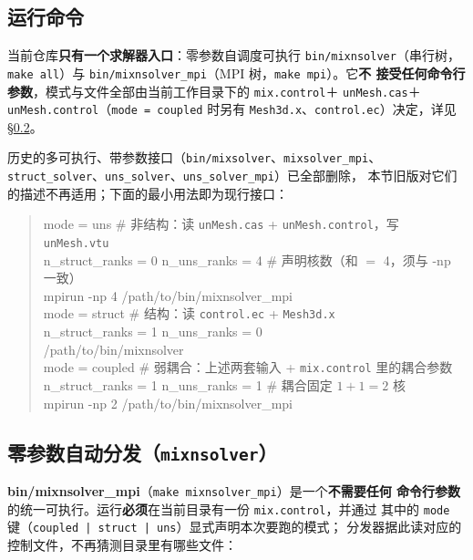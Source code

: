 \documentclass[11pt,a4paper]{ctexart}
\begin{document}
\subsection{运行命令}

当前仓库\textbf{只有一个求解器入口}：零参数自调度可执行 \texttt{bin/mixnsolver}（串行树，
\texttt{make all}）与 \texttt{bin/mixnsolver\_mpi}（MPI 树，\texttt{make mpi}）。它\textbf{不
接受任何命令行参数}，模式与文件全部由当前工作目录下的 \texttt{mix.control}＋
\texttt{unMesh.cas}＋\texttt{unMesh.control}（\texttt{mode = coupled} 时另有
\texttt{Mesh3d.x}、\texttt{control.ec}）决定，详见 \S\ref{sec:autodispatch}。

历史的多可执行、带参数接口（\texttt{bin/mixsolver}、\texttt{mixsolver\_mpi}、
\texttt{struct\_solver}、\texttt{uns\_solver}、\texttt{uns\_solver\_mpi}）已全部删除，
本节旧版对它们的描述不再适用；下面的最小用法即为现行接口：

\begin{quote}\ttfamily\small
mode = uns \qquad \# 非结构：读 \texttt{unMesh.cas} + \texttt{unMesh.control}，写 \texttt{unMesh.vtu}\\
n\_struct\_ranks = 0 \quad n\_uns\_ranks = 4 \qquad \# 声明核数（和 $=$ 4，须与 -np 一致）\\
mpirun -np 4 /path/to/bin/mixnsolver\_mpi\\
\medskip
mode = struct \qquad \# 结构：读 \texttt{control.ec} + \texttt{Mesh3d.x}\\
n\_struct\_ranks = 1 \quad n\_uns\_ranks = 0\\
/path/to/bin/mixnsolver\\
\medskip
mode = coupled \qquad \# 弱耦合：上述两套输入 + \texttt{mix.control} 里的耦合参数\\
n\_struct\_ranks = 1 \quad n\_uns\_ranks = 1 \qquad \# 耦合固定 $1+1=2$ 核\\
mpirun -np 2 /path/to/bin/mixnsolver\_mpi
\end{quote}

\subsection{零参数自动分发（\texttt{mixnsolver}）}\label{sec:autodispatch}

\textbf{bin/mixnsolver\_mpi}（\texttt{make mixnsolver\_mpi}）是一个\textbf{不需要任何
命令行参数}的统一可执行。运行\textbf{必须}在当前目录有一份 \texttt{mix.control}，并通过
其中的 \texttt{mode} 键（\texttt{coupled | struct | uns}）显式声明本次要跑的模式；
分发器据此读对应的控制文件，不再猜测目录里有哪些文件：
\end{document}

